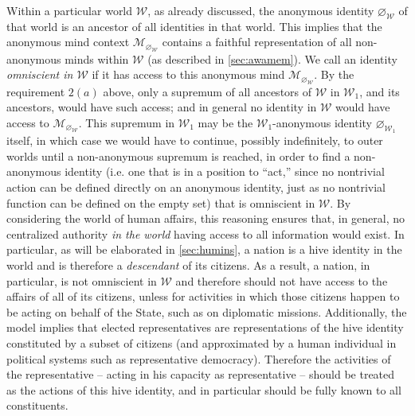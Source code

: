 \documentclass[pra,twocolumn,groupedaddress,10pt]{revtex4}
\theoremstyle{definition}
\begin{document}
Within a particular world $\mathcal{W}$, as already discussed, the anonymous identity $\varnothing_\mathcal{W}$ of that world is an ancestor of all identities in that world. This implies that the anonymous mind context ${\mathcal{M}}_{\varnothing_{\mathcal{W}}}$ contains a faithful representation of all non-anonymous minds within $\mathcal{W}$ (as described in \autoref{sec:awamem}). We call an identity \emph{omniscient in $\mathcal{W}$} if it has access to this anonymous mind ${\mathcal{M}}_{\varnothing_{\mathcal{W}}}$. By the requirement $2(a)$ above, only a supremum of all ancestors of $\mathcal{W}$ in $\mathcal{W}_1$, and its ancestors, would have such access; and in general no identity in $\mathcal{W}$ would have access to ${\mathcal{M}}_{\varnothing_{\mathcal{W}}}$. This supremum in $\mathcal{W}_1$ may be the $\mathcal{W}_1$-anonymous identity $\varnothing_{\mathcal{W}_1}$ itself, in which case we would have to continue, possibly indefinitely, to outer worlds until a non-anonymous supremum is reached, in order to find a non-anonymous identity (i.e. one that is in a position to ``act,'' since no nontrivial action can be defined directly on an anonymous identity, just as no nontrivial function can be defined on the empty set) that is omniscient in $\mathcal{W}$. By considering the world of human affairs, this reasoning ensures that, in general, no centralized authority \textit{in the world} having access to all information would exist. In particular, as will be elaborated in \autoref{sec:humins}, a nation is a hive identity in the world and is therefore a \textit{descendant} of its citizens. As a result, a nation, in particular, is not omniscient in $\mathcal{W}$ and therefore should not have access to the affairs of all of its citizens, unless for activities in which those citizens happen to be acting on behalf of the State, such as on diplomatic missions. Additionally, the model implies that elected representatives are representations of the hive identity constituted by a subset of citizens (and approximated by a human individual in political systems such as representative democracy). Therefore the activities of the representative -- acting in his capacity as representative -- should be treated as the actions of this hive identity, and in particular should be fully known to all constituents.
\end{document}
